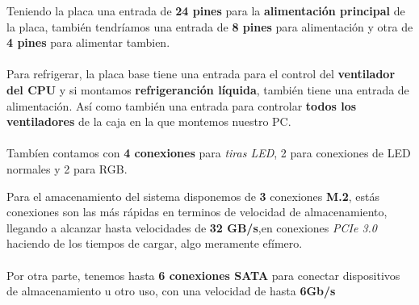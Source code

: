 \documentclass{article}
\begin{document}
Teniendo la placa una entrada de \textbf{24 pines} para la \textbf{alimentación principal} de la placa,
también tendríamos una entrada de \textbf{8 pines} para alimentación y otra de \textbf{4 pines} para alimentar tambien. 
\\\\
Para refrigerar, la placa base tiene una entrada para el control del \textbf{ventilador del CPU} y si montamos \textbf{refrigeranción líquida}, también tiene una entrada de alimentación. Así como también una entrada 
para controlar \textbf{todos los ventiladores} de la caja en la que montemos nuestro PC.
\\\\
Tambíen contamos con \textbf{4 conexiones} para \textit{tiras LED}, 2 para conexiones de LED normales y 2 para RGB.

\clearpage
\newpage
Para el amacenamiento del sistema disponemos de \textbf{3} conexiones \textbf{M.2}, estás conexiones son las más rápidas en terminos de velocidad de almacenamiento, llegando a alcanzar hasta velocidades de 
\textbf{32 GB/s},en conexiones \textit{PCIe 3.0} haciendo de los tiempos de cargar, algo meramente efímero.
\\\\
Por otra parte, tenemos hasta \textbf{6 conexiones SATA} para conectar dispositivos de almacenamiento u otro uso, con una velocidad de hasta \textbf{6Gb/s}
\end{document}
